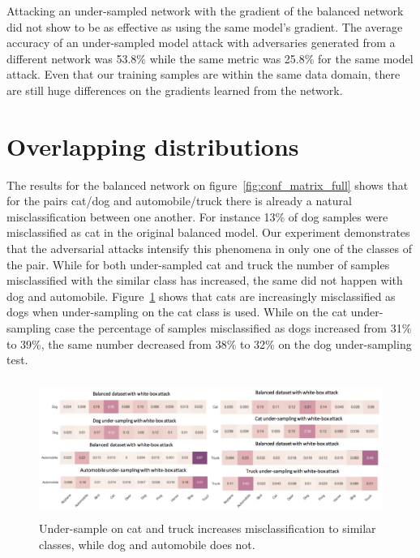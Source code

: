 Attacking an under-sampled network with the gradient of the balanced network did not show to be as effective as using the same model's gradient. The average accuracy of an under-sampled model attack with adversaries generated from a different network was 53.8\% while the same metric was 25.8\% for the same model attack. Even that our training samples are within the same data domain, there are still huge differences on the gradients learned from the network. 

\section{Overlapping distributions}
The results for the balanced network on figure~\ref{fig:conf_matrix_full} shows that for the pairs cat/dog and automobile/truck there is already a natural misclassification between one another. For instance 13\% of dog samples were misclassified as cat in the original balanced model. Our experiment demonstrates that the adversarial attacks intensify this phenomena in only one of the classes of the pair. While for both under-sampled cat and truck the number of samples misclassified with the similar class has increased, the same did not happen with dog and automobile. Figure~\ref{fig:overlap} shows that cats are increasingly misclassified as dogs when under-sampling on the cat class is used. While on the cat under-sampling case the percentage of samples misclassified as dogs increased from 31\% to 39\%, the same number decreased from 38\% to 32\% on the dog under-sampling test.
\begin{figure}
	\centering
	\includegraphics[height=4.5cm]{overlapping_all.png}
	\caption{Under-sample on cat and truck increases misclassification to similar classes, while dog and automobile does not.}
	\label{fig:overlap}
\end{figure}